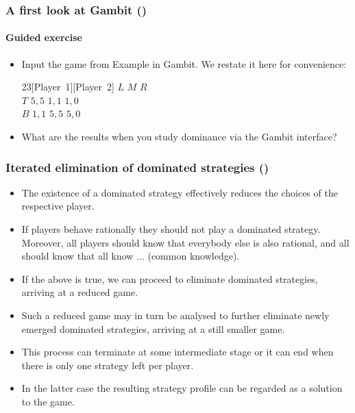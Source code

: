 \documentclass[10pt]{beamer}
\theoremstyle{definition}
\begin{document}
\begin{frame}[fragile]
\frametitle{A first look at Gambit ()}
\framesubtitle{Guided exercise}
\begin{itemize}\itemsep1em
\item Input the game from Example  in Gambit. We restate it here for convenience:
\begin{center}
\begin{game}{2}{3}[Player~1][Player~2]
 \> $ L $ \> $ M $ \> $ R $ \\
$ T $ \> $ 5,5 $ \> $ 1,1 $ \> $ 1,0 $ \\
$ B $ \> $ 1,1 $ \> $ 5,5 $ \> $ 5,0 $
\end{game}
\end{center}
\item What are the results when you study dominance via the Gambit interface?
\end{itemize}
\end{frame}



\setcounter{slidenum}{1}
\begin{frame}[fragile]
\frametitle{Iterated elimination of dominated strategies ()}
\begin{itemize}\itemsep1em
\item The existence of a dominated strategy effectively reduces the choices of the respective player.
\item If players behave rationally they should not play a dominated strategy. Moreover, all players should know that everybody else is also rational, and all should know that all know ... (common knowledge).
\item If the above is true, we can proceed to eliminate dominated strategies, arriving at a reduced game.
\item Such a reduced game may in turn be analysed to further eliminate newly emerged dominated strategies, arriving at a still smaller game.
\item This process can terminate at some intermediate stage or it can end when there is only one strategy left per player.
\item In the latter case the resulting strategy profile can be regarded as a solution to the game.
\end{itemize}
\end{frame}
\end{document}
